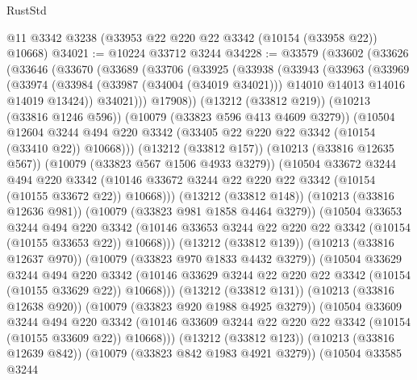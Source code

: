 \begin{lexlean}{RustStd}
\begin{coremodule}
{\begin{coremodule}
{{{{{{{{{{{{{{{{{{{{{{{{{{    @11
    @3342
    @3238
    (@33953 @22 @220 @22 @3342 (@10154 (@33958 @22)) @10668)
@34021 := @10224 @33712 @3244
@34228 := @33579
    (@33602
      (@33626
        (@33646
          (@33670
            (@33689
              (@33706
                (@33925
                  (@33938
                    (@33943
                      (@33963
                        (@33969
                          (@33974
                            (@33984
                              (@33987 (@34004 (@34019 @34021)))
                              @14010
                              @14013
                              @14016
                              @14019
                              @13424))
                          @34021)))
                    @17908))
                (@13212 (@33812 @219))
                (@10213 (@33816 @1246 @596))
                (@10079 (@33823 @596 @413 @4609 @3279))
                (@10504
                  @12604
                  @3244
                  @494
                  @220
                  @3342
                  (@33405 @22 @220 @22 @3342 (@10154 (@33410 @22)) @10668)))
              (@13212 (@33812 @157))
              (@10213 (@33816 @12635 @567))
              (@10079 (@33823 @567 @1506 @4933 @3279))
              (@10504
                @33672
                @3244
                @494
                @220
                @3342
                (@10146 @33672 @3244 @22 @220 @22 @3342 (@10154 (@10155 @33672 @22)) @10668)))
            (@13212 (@33812 @148))
            (@10213 (@33816 @12636 @981))
            (@10079 (@33823 @981 @1858 @4464 @3279))
            (@10504
              @33653
              @3244
              @494
              @220
              @3342
              (@10146 @33653 @3244 @22 @220 @22 @3342 (@10154 (@10155 @33653 @22)) @10668)))
          (@13212 (@33812 @139))
          (@10213 (@33816 @12637 @970))
          (@10079 (@33823 @970 @1833 @4432 @3279))
          (@10504
            @33629
            @3244
            @494
            @220
            @3342
            (@10146 @33629 @3244 @22 @220 @22 @3342 (@10154 (@10155 @33629 @22)) @10668)))
        (@13212 (@33812 @131))
        (@10213 (@33816 @12638 @920))
        (@10079 (@33823 @920 @1988 @4925 @3279))
        (@10504
          @33609
          @3244
          @494
          @220
          @3342
          (@10146 @33609 @3244 @22 @220 @22 @3342 (@10154 (@10155 @33609 @22)) @10668)))
      (@13212 (@33812 @123))
      (@10213 (@33816 @12639 @842))
      (@10079 (@33823 @842 @1983 @4921 @3279))
      (@10504
        @33585
        @3244
}}}}}}}}}}}}}}}}}}}}}}}}}}
\end{coremodule}}
\end{coremodule}
\end{lexlean}
